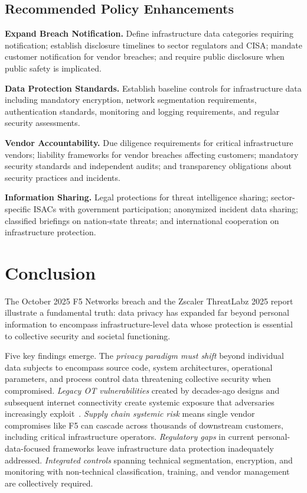 \documentclass[sigconf,nonacm]{acmart}
\begin{document}
\subsection{Recommended Policy Enhancements}

\textbf{Expand Breach Notification.} Define infrastructure data categories requiring
notification; establish disclosure timelines to sector regulators and CISA; mandate
customer notification for vendor breaches; and require public disclosure when public
safety is implicated.

\textbf{Data Protection Standards.} Establish baseline controls for infrastructure
data including mandatory encryption, network segmentation requirements, authentication
standards, monitoring and logging requirements, and regular security assessments.

\textbf{Vendor Accountability.} Due diligence requirements for critical infrastructure
vendors; liability frameworks for vendor breaches affecting customers; mandatory security
standards and independent audits; and transparency obligations about security practices
and incidents.

\textbf{Information Sharing.} Legal protections for threat intelligence sharing;
sector-specific ISACs with government participation; anonymized incident data sharing;
classified briefings on nation-state threats; and international cooperation on
infrastructure protection.

\section{Conclusion}
\sloppy

The October 2025 F5 Networks breach and the Zscaler ThreatLabz 2025 report illustrate a
fundamental truth: data privacy has expanded far beyond personal information to encompass
infrastructure-level data whose protection is essential to collective security and
societal functioning.

Five key findings emerge. The \emph{privacy paradigm must shift} beyond individual data
subjects to encompass source code, system architectures, operational parameters, and
process control data threatening collective security when compromised. \emph{Legacy OT
vulnerabilities} created by decades-ago designs and subsequent internet connectivity
create systemic exposure that adversaries increasingly exploit~\cite{lee2025dragos}.
\emph{Supply chain systemic risk} means single vendor compromises like F5 can cascade
across thousands of downstream customers, including critical infrastructure operators.
\emph{Regulatory gaps} in current personal-data-focused frameworks leave infrastructure
data protection inadequately addressed. \emph{Integrated controls} spanning technical
segmentation, encryption, and monitoring with non-technical classification, training,
and vendor management are collectively required.
\end{document}
